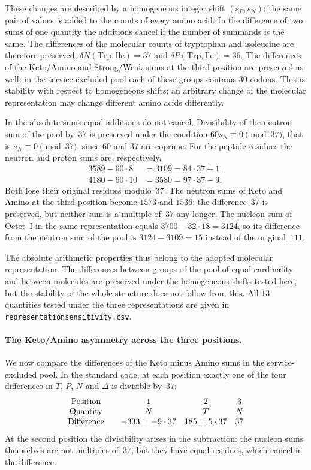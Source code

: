 \documentclass[11pt,a4paper]{article}
\renewcommand{\_}{\origunderscore\allowbreak}
\begin{document}
These changes are described by a homogeneous integer shift
$(s_P,s_N)$: the same pair of values is added to the counts of every
amino acid. In the difference of two sums of one quantity the
additions cancel if the number of summands is the same. The
differences of the molecular counts of tryptophan and isoleucine are
therefore preserved, $\delta N(\mathrm{Trp},\mathrm{Ile})=37$ and
$\delta P(\mathrm{Trp},\mathrm{Ile})=36$. The differences of the
Keto/Amino and Strong/Weak sums at the third position are preserved
as well: in the service-excluded pool each of these groups contains
$30$ codons. This is stability with respect to homogeneous shifts;
an arbitrary change of the molecular representation may change
different amino acids differently.

In the absolute sums equal additions do not cancel. Divisibility of
the neutron sum of the pool by~$37$ is preserved under the condition
$60s_N\equiv0\pmod{37}$, that is $s_N\equiv0\pmod{37}$, since $60$
and $37$ are coprime. For the peptide residues the neutron and
proton sums are, respectively,
\[
\begin{aligned}
3589-60\cdot8&=3109=84\cdot37+1,\\
4180-60\cdot10&=3580=97\cdot37-9.
\end{aligned}
\]
Both lose their original residues modulo~$37$. The neutron sums of
Keto and Amino at the third position become $1573$ and $1536$: the
difference~$37$ is preserved, but neither sum is a multiple of~$37$
any longer. The nucleon sum of Octet~I in the same representation
equals $3700-32\cdot18=3124$, so its difference from the neutron sum
of the pool is $3124-3109=15$ instead of the original~$111$.

The absolute arithmetic properties thus belong to the adopted
molecular representation. The differences between groups of the pool
of equal cardinality and between molecules are preserved under the
homogeneous shifts tested here, but the stability of the whole
structure does not follow from this. All $13$ quantities tested
under the three representations are given in
\texttt{representation\_sensitivity.csv}.

\paragraph{The Keto/Amino asymmetry across the three positions.}
We now compare the differences of the Keto minus Amino sums in the
service-excluded pool. In the standard code, at each position
exactly one of the four differences in $T$, $P$, $N$ and $\Delta$ is
divisible by~$37$:
\[
\begin{array}{c@{\qquad}ccc}
\text{Position} & 1 & 2 & 3 \\
\text{Quantity} & N & T & N \\
\text{Difference} & -333=-9\cdot37 & 185=5\cdot37 & 37
\end{array}
\]
At the second position the divisibility arises in the subtraction:
the nucleon sums themselves are not multiples of~$37$, but they have
equal residues, which cancel in the difference.
\end{document}
